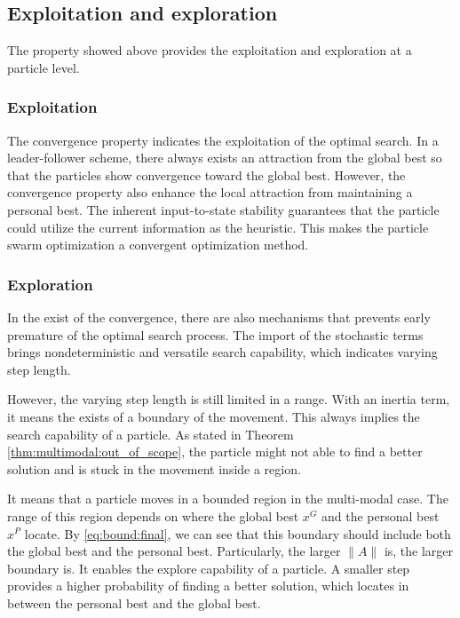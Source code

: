 \subsection{Exploitation and exploration}

The property showed above provides the exploitation and exploration at a particle level.


\subsubsection{Exploitation}

The convergence property indicates the exploitation of the optimal search.
In a leader-follower scheme, there always exists an attraction from the global best so that the particles show convergence toward the global best.
However, the convergence property also enhance the local attraction from maintaining a personal best.
The inherent input-to-state stability guarantees that the particle could utilize the current information as the heuristic.
This makes the particle swarm optimization a convergent optimization method.

\subsubsection{Exploration}

In the exist of the convergence, there are also mechanisms that prevents early premature of the optimal search process.
The import of the stochastic terms brings nondeterministic and versatile search capability, which indicates varying step length.

However, the varying step length is still limited in a range. 
With an inertia term, it means the exists of a boundary of the movement.
This always implies the search capability of a particle.
As stated in Theorem \ref{thm:multimodal:out_of_scope}, the particle might not able to find a better solution and is stuck in the movement inside a region.

It means that a particle moves in a bounded region in the multi-modal case.
The range of this region depends on where the global best $ x^{G} $ and the personal best $ x^{P} $ locate.
By \eqref{eq:bound:final}, we can see that this boundary should include both the global best and the personal best.
Particularly, the larger $ \lVert A \rVert $ is, the larger boundary is.
It enables the explore capability of a particle.
A smaller step provides a higher probability of finding a better solution, which locates in between the personal best and the global best.

